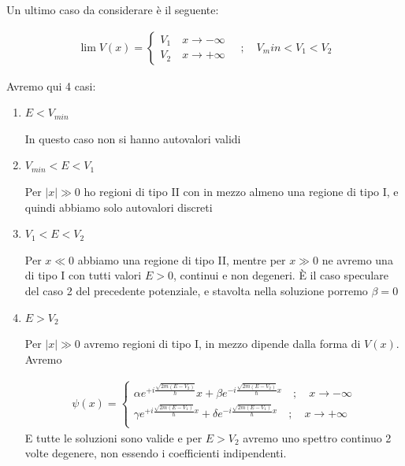 \newpage

Un ultimo caso da considerare è il seguente:

\begin{align}
\lim V(x)=
\left\{
\begin{array}{cc}
V_1 \quad x\rightarrow -\infty \\
V_2 \quad x\rightarrow +\infty
\end{array}
\right. \quad ; \quad V_min<V_1<V_2
\end{align}

\begin{figure}[!htb]
\end{figure}

Avremo qui 4 casi:

\begin{enumerate}
	\item $E<V_{min}$
	
	In questo caso non si hanno autovalori validi
	
	\item $V_{min}<E<V_1$
	
	Per $|x|\gg 0$ ho regioni di tipo II con in mezzo almeno una regione di tipo I, e quindi abbiamo solo autovalori discreti
	
	\item $V_1<E<V_2$
	
	Per $x \ll 0$ abbiamo una regione di tipo II, mentre per $x \gg 0$ ne avremo una di tipo I con tutti valori $E>0$, continui e non degeneri. È il caso speculare del caso 2 del precedente potenziale, e stavolta nella soluzione porremo $\beta=0$
	
	\item $E>V_2$
	
	Per $|x|\gg 0$ avremo regioni di tipo I, in mezzo dipende dalla forma di $V(x)$.
		Avremo 
	
	\begin{align}
	\psi(x)= \left\{
	\begin{array}{cc}
	\alpha e^{+i\frac{\sqrt{2m(E-V_2)}}{\hbar}}x + \beta e^{-i \frac{\sqrt{2m(E-V_2)}}{\hbar}x} \quad;\quad  x\rightarrow -\infty \\
	\gamma e^{+i \frac{\sqrt{2m(E-V_1)}}{\hbar}x} + \delta e^{-i \frac{\sqrt{2m(E-V_1)}}{\hbar}x} \quad;\quad  x\rightarrow +\infty \\
	\end{array}
	\right.
	\end{align}
	E tutte le soluzioni sono valide e per $E>V_2$ avremo uno spettro continuo 2 volte degenere, non essendo i coefficienti indipendenti.
\end{enumerate}

